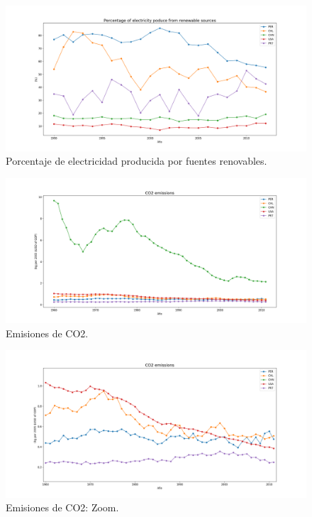 \documentclass{article}
\begin{document}
\begin{figure}
	\centering
	\includegraphics[scale=0.38]{images/figure_1-7.png}
	\caption{Porcentaje de electricidad producida por fuentes renovables.}
	\label{fig:9}
\end{figure}

\begin{figure}
	\centering
	\includegraphics[scale=0.38]{images/figure_1-8.png}
	\caption{Emisiones de CO2.}
	\label{fig:10}
\end{figure}

\begin{figure}
	\centering
	\includegraphics[scale=0.38]{images/zoom - co2.png}
	\caption{Emisiones de CO2: Zoom.}
	\label{fig:11}
\end{figure}
\end{document}

